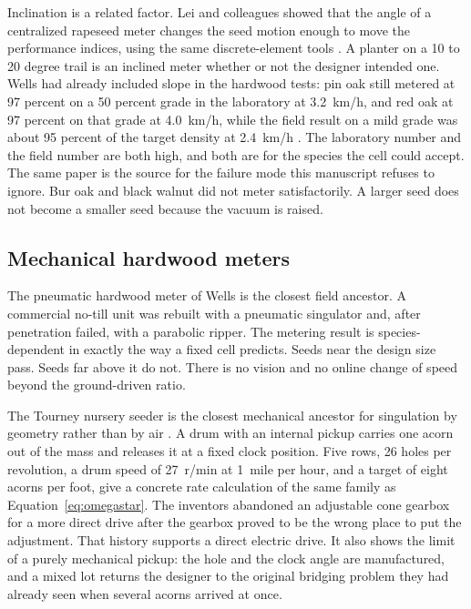 Inclination is a related factor. Lei and colleagues showed that the angle of a centralized rapeseed meter changes the seed motion enough to move the performance indices, using the same discrete-element tools \cite{lei2022,lei2021,hu2021}. A planter on a 10 to 20 degree trail is an inclined meter whether or not the designer intended one. Wells had already included slope in the hardwood tests: pin oak still metered at 97 percent on a 50 percent grade in the laboratory at 3.2~km/h, and red oak at 97 percent on that grade at 4.0~km/h, while the field result on a mild grade was about 95 percent of the target density at 2.4~km/h \cite{wells1990}. The laboratory number and the field number are both high, and both are for the species the cell could accept. The same paper is the source for the failure mode this manuscript refuses to ignore. Bur oak and black walnut did not meter satisfactorily. A larger seed does not become a smaller seed because the vacuum is raised.

\subsection{Mechanical hardwood meters}

The pneumatic hardwood meter of Wells is the closest field ancestor. A commercial no-till unit was rebuilt with a pneumatic singulator and, after penetration failed, with a parabolic ripper. The metering result is species-dependent in exactly the way a fixed cell predicts. Seeds near the design size pass. Seeds far above it do not. There is no vision and no online change of speed beyond the ground-driven ratio.

The Tourney nursery seeder is the closest mechanical ancestor for singulation by geometry rather than by air \cite{dinkel1991}. A drum with an internal pickup carries one acorn out of the mass and releases it at a fixed clock position. Five rows, 26 holes per revolution, a drum speed of 27~r/min at 1~mile per hour, and a target of eight acorns per foot, give a concrete rate calculation of the same family as Equation~\eqref{eq:omegastar}. The inventors abandoned an adjustable cone gearbox for a more direct drive after the gearbox proved to be the wrong place to put the adjustment. That history supports a direct electric drive. It also shows the limit of a purely mechanical pickup: the hole and the clock angle are manufactured, and a mixed lot returns the designer to the original bridging problem they had already seen when several acorns arrived at once.

